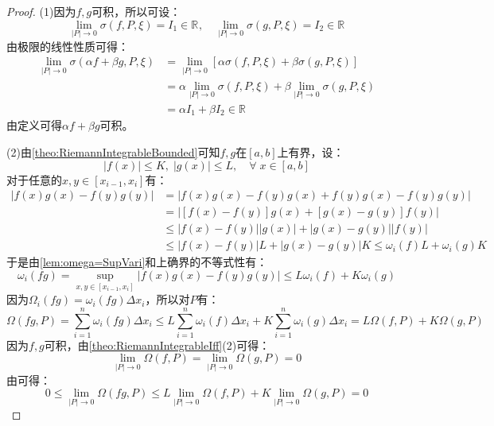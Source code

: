 \begin{proof}
	(1)因为$f,g$可积，所以可设：
	\begin{equation*}
		\lim_{|P|\to0}\sigma(f,P,\xi)=I_1\in\mathbb{R}^{},\quad\lim_{|P|\to0}\sigma(g,P,\xi)=I_2\in\mathbb{R}^{}
	\end{equation*}
	由极限的线性性质可得：
	\begin{align*}
		\lim_{|P|\to0}\sigma(\alpha f+\beta g,P,\xi)&=\lim_{|P|\to0}[\alpha\sigma(f,P,\xi)+\beta\sigma(g,P,\xi)] \\
		&=\alpha\lim_{|P|\to0}\sigma(f,P,\xi)+\beta\lim_{|P|\to0}\sigma(g,P,\xi) \\
		&=\alpha I_1+\beta I_2\in\mathbb{R}^{}
	\end{align*}
	由定义可得$\alpha f+\beta g$可积。\par
	(2)由\cref{theo:RiemannIntegrableBounded}可知$f,g$在$[a,b]$上有界，设：
	\begin{equation*}
		|f(x)|\leqslant K,\;|g(x)|\leqslant L,\quad\forall\;x\in[a,b]
	\end{equation*}
	对于任意的$x,y\in[x_{i-1},x_i]$有：
	\begin{align*}
		|f(x)g(x)-f(y)g(y)|&=|f(x)g(x)-f(y)g(x)+f(y)g(x)-f(y)g(y)| \\
		&=|[f(x)-f(y)]g(x)+[g(x)-g(y)]f(y)| \\
		&\leqslant|f(x)-f(y)||g(x)|+|g(x)-g(y)||f(y)| \\
		&\leqslant|f(x)-f(y)|L+|g(x)-g(y)|K\leqslant\omega_i(f)L+\omega_i(g)K
	\end{align*}
	于是由\cref{lem:omega=SupVari}和上确界的不等式性有：
	\begin{equation*}
		\omega_i(fg)=\sup_{x,y\in[x_{i-1},x_i]}|f(x)g(x)-f(y)g(y)|\leqslant L\omega_i(f)+K\omega_i(g)
	\end{equation*}
	因为$\Omega_i(fg)=\omega_i(fg)\Delta x_i$，所以对$P$有：
	\begin{equation*}
		\Omega(fg,P)=\sum_{i=1}^{n}\omega_i(fg)\Delta x_i\leqslant L\sum_{i=1}^{n}\omega_i(f)\Delta x_i+K\sum_{i=1}^{n}\omega_i(g)\Delta x_i=L\Omega(f,P)+K\Omega(g,P)
	\end{equation*}
	因为$f,g$可积，由\cref{theo:RiemannIntegrableIff}(2)可得：
	\begin{equation*}
		\lim_{|P|\to0}\Omega(f,P)=\lim_{|P|\to0}\Omega(g,P)=0
	\end{equation*}
	由可得：
	\begin{equation*}
		0\leqslant\lim_{|P|\to0}\Omega(fg,P)\leqslant L\lim_{|P|\to0}\Omega(f,P)+K\lim_{|P|\to0}\Omega(g,P)=0

\end{equation*}
\end{proof}

